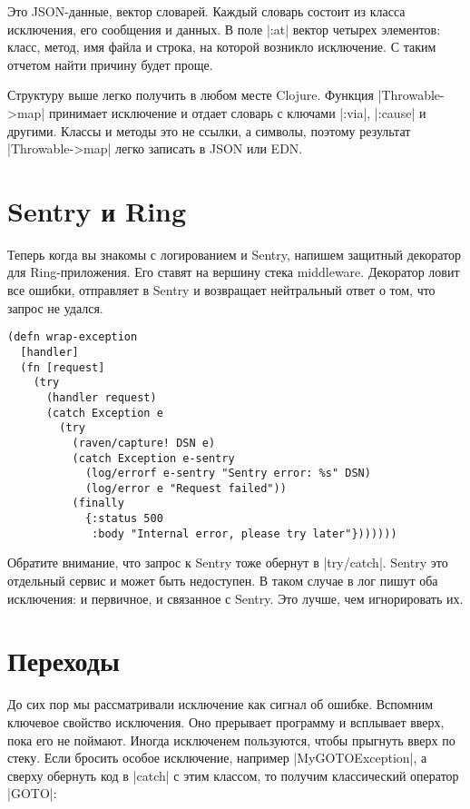 Это JSON-данные, вектор словарей. Каждый словарь состоит из класса исключения,
его сообщения и данных. В поле \spverb|:at| вектор четырех элементов: класс,
метод, имя файла и строка, на которой возникло исключение. С таким отчетом найти
причину будет проще.

Структуру выше легко получить в любом месте Clojure. Функция
\spverb|Throwable->map| принимает исключение и отдает словарь с ключами
\spverb|:via|, \spverb|:cause| и другими. Классы и методы это не ссылки, а
символы, поэтому результат \spverb|Throwable->map| легко записать в JSON или
EDN.

\section{Sentry и Ring}


Теперь когда вы знакомы с логированием и Sentry, напишем защитный декоратор для
Ring-приложения. Его ставят на вершину стека middleware. Декоратор ловит все
ошибки, отправляет в Sentry и возвращает нейтральный ответ о том, что запрос не
удался.

\begin{verbatim}
(defn wrap-exception
  [handler]
  (fn [request]
    (try
      (handler request)
      (catch Exception e
        (try
          (raven/capture! DSN e)
          (catch Exception e-sentry
            (log/errorf e-sentry "Sentry error: %s" DSN)
            (log/error e "Request failed"))
          (finally
            {:status 500
             :body "Internal error, please try later"}))))))
\end{verbatim}

Обратите внимание, что запрос к Sentry тоже обернут в \spverb|try/catch|. Sentry
это отдельный сервис и может быть недоступен. В таком случае в лог пишут оба
исключения: и первичное, и связанное с Sentry. Это лучше, чем игнорировать их.

\section{Переходы}

До сих пор мы рассматривали исключение как сигнал об ошибке. Вспомним ключевое
свойство исключения. Оно прерывает программу и всплывает вверх, пока его не
поймают. Иногда исключенем пользуются, чтобы прыгнуть вверх по стеку. Если
бросить особое исключение, например \spverb|MyGOTOException|, а сверху обернуть
код в \spverb|catch| с этим классом, то получим классический оператор
\spverb|GOTO|:

